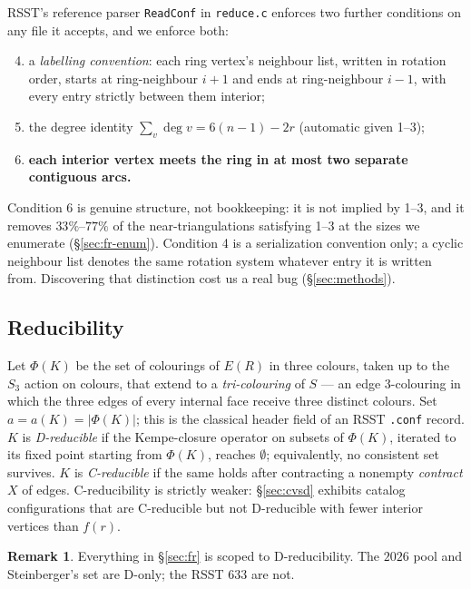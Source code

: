 \documentclass[11pt]{article}
\theoremstyle{definition}
\newtheorem{remark}[theorem]{Remark}
\begin{document}
RSST's reference parser \texttt{ReadConf} in \texttt{reduce.c} enforces two further
conditions on any file it accepts, and we enforce both:
\begin{enumerate}
  \setcounter{enumi}{3}
  \item a \emph{labelling convention}: each ring vertex's neighbour list, written in
        rotation order, starts at ring-neighbour $i+1$ and ends at ring-neighbour
        $i-1$, with every entry strictly between them interior;
  \item the degree identity $\sum_v \deg v = 6(n-1)-2r$ (automatic given 1--3);
  \item \textbf{each interior vertex meets the ring in at most two separate
        contiguous arcs.}
\end{enumerate}
Condition 6 is genuine structure, not bookkeeping: it is not implied by 1--3, and it
removes $33\%$--$77\%$ of the near-triangulations satisfying 1--3 at the sizes we
enumerate (\S\ref{sec:fr-enum}). Condition 4 is a serialization convention only; a
cyclic neighbour list denotes the same rotation system whatever entry it is written
from. Discovering that distinction cost us a real bug (\S\ref{sec:methods}).

\subsection{Reducibility}

Let $\Phi(K)$ be the set of colourings of $E(R)$ in three colours, taken up to the
$S_3$ action on colours, that extend to a \emph{tri-colouring} of $S$ --- an edge
$3$-colouring in which the three edges of every internal face receive three distinct
colours. Set $a = a(K) = |\Phi(K)|$; this is the classical header field of an RSST
\texttt{.conf} record. $K$ is \emph{D-reducible} if the Kempe-closure operator on
subsets of $\Phi(K)$, iterated to its fixed point starting from $\Phi(K)$, reaches
$\emptyset$; equivalently, no consistent set survives. $K$ is \emph{C-reducible} if
the same holds after contracting a nonempty \emph{contract} $X$ of edges. C-reducibility
is strictly weaker: \S\ref{sec:cvsd} exhibits catalog configurations that are
C-reducible but not D-reducible with fewer interior vertices than $f(r)$.

\begin{remark}
Everything in \S\ref{sec:fr} is scoped to D-reducibility. The $2026$ pool
\cite{nl4ct2026} and Steinberger's set \cite{steinberger2010} are D-only; the RSST
$633$ are not.
\end{remark}
\end{document}
